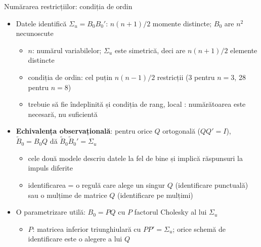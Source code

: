 \begin{frame}{Numărarea restricțiilor: condiția de ordin}
\itemsize{\footnotesize}
\begin{itemize}
    \item Datele identifică $\Sigma_u = B_0B_0'$: $n(n + 1)/2$ momente distincte; $B_0$ are $n^2$ necunoscute
    \begin{itemize}
        \item $n$: numărul variabilelor; $\Sigma_u$ este simetrică, deci are $n(n + 1)/2$ elemente distincte
        \item condiția de ordin: cel puțin $n(n - 1)/2$ restricții (3 pentru $n = 3$, 28 pentru $n = 8$)
        \item trebuie să fie îndeplinită și condiția de rang, local : numărătoarea este necesară, nu suficientă
    \end{itemize}
    \item \textbf{Echivalența observațională}: pentru orice $Q$ ortogonală ($QQ' = I$), $\tilde B_0 = B_0Q$ dă $\tilde B_0\tilde B_0' = \Sigma_u$
    \begin{itemize}
        \item cele două modele descriu datele la fel de bine și implică răspunsuri la impuls diferite
        \item identificarea = o regulă care alege un singur $Q$ (identificare punctuală) sau o mulțime de matrice $Q$ (identificare pe mulțimi)
    \end{itemize}
    \item O parametrizare utilă: $B_0 = PQ$ cu $P$ factorul Cholesky al lui $\Sigma_u$
    \begin{itemize}
        \item $P$: matricea inferior triunghiulară cu $PP' = \Sigma_u$; orice schemă de identificare este o alegere a lui $Q$
    \end{itemize}
\end{itemize}
\end{frame}

